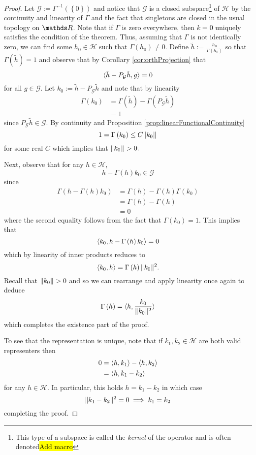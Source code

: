 \begin{proof}
Let $\mathcal{G:=}\Gamma^{-1}\left(\left\{ 0\right\} \right)$ and
notice that $\mathcal{G}$ is a closed subspace\footnote{This type of a subspace is called the \emph{kernel }of the operator
and is often denoted\hl{Add macro}} of $\mathcal{H}$ by the continuity and linearity of $\Gamma$ and
the fact that singletons are closed in the usual topology on $\R$.
Note that if $\Gamma$ is zero everywhere, then $k=0$ uniquely satisfies
the condition of the theorem. Thus, assuming that $\Gamma$ is not
identically zero, we can find some $h_{0}\in\mathcal{H}$ such that
$\Gamma\left(h_{0}\right)\neq0$. Define $\tilde{h}:=\frac{h_{0}}{\Gamma(h_{0})}$
so that $\Gamma\left(\tilde{h}\right)=1$ and observe that by Corollary
\ref{cor:orthProjection} that
\[
\langle\tilde{h}-P_{\mathcal{G}}\tilde{h},g\rangle=0
\]
for all $g\in\mathcal{\mathcal{G}}.$ Let $k_{0}:=\tilde{h}-P_{\mathcal{G}}\tilde{h}$
and note that by linearity
\begin{align*}
\Gamma\left(k_{0}\right) & =\Gamma\left(\tilde{h}\right)-\Gamma\left(P_{\mathcal{G}}\tilde{h}\right)\\
 & =1
\end{align*}
since $P_{\mathcal{G}}\tilde{h}\in\mathcal{G}.$ By continuity and
Proposition \ref{prop:linearFunctionalContinuity}
\[
1=\Gamma\left(k_{0}\right)\leq C\lVert k_{0}\rVert_{}
\]
for some real $C$ which implies that $\lVert k_{0}\rVert_{}>0.$

Next, observe that for any $h\in\mathcal{H}$, 
\[
h-\Gamma\left(h\right)k_{0}\in\mathcal{G}
\]
since
\begin{align*}
\Gamma\left(h-\Gamma\left(h\right)k_{0}\right) & =\Gamma\left(h\right)-\Gamma\left(h\right)\Gamma\left(k_{0}\right)\\
 & =\Gamma\left(h\right)-\Gamma\left(h\right)\\
 & =0
\end{align*}
where the second equality follows from the fact that $\Gamma\left(k_{0}\right)=1.$
This implies that 
\[
\langle k_{0},h-\Gamma\left(h\right)k_{0}\rangle=0
\]
which by linearity of inner products reduces to
\[
\langle k_{0},h\rangle=\Gamma\left(h\right)\lVert k_{0}\rVert_{}^{2}.
\]
Recall that $\lVert k_{0}\rVert_{}>0$ and so we can rearrange and apply
linearity once again to deduce
\[
\Gamma\left(h\right)=\langle h,\frac{k_{0}}{\lVert k_{0}\rVert_{}^{2}}\rangle
\]
which completes the existence part of the proof.

To see that the representation is unique, note that if $k_{1},k_{2}\in\mathcal{H}$
are both valid representers then
\begin{align*}
0 & =\langle h,k_{1}\rangle-\langle h,k_{2}\rangle\\
 & =\langle h,k_{1}-k_{2}\rangle
\end{align*}
for any $h\in\mathcal{H}.$ In particular, this holds $h=k_{1}-k_{2}$
in which case
\[
\lVert k_{1}-k_{2}\rVert_{}^{2}=0\implies k_{1}=k_{2}
\]
completing the proof.
\end{proof}
